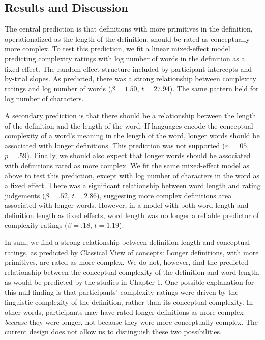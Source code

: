\subsection{Results and Discussion}
The central prediction is that definitions with more primitives in the definition, operationalized as the length of the definition, should be rated as conceptually more complex. To test this prediction, we fit a linear mixed-effect model predicting complexity ratings with log number of words in the definition as a fixed effect. The random effect structure included by-participant intercepts and by-trial slopes. As predicted, there was a strong relationship between complexity ratings and log number of words ($\beta=1.50$, $t =27.94$). The same pattern held for log number of characters.

A secondary prediction is that there should be a relationship between the length of the definition and the length of the word: If languages encode the conceptual complexity of a word's meaning in the length of the word, longer words should be associated with longer definitions. This prediction was not supported ($r=.05$, $p =.59$). Finally, we should also expect that  longer words should be associated with definitions rated as more complex. We fit the same mixed-effect model as above to test this prediction, except with log number of characters in the word as a fixed effect. There was a significant relationship between word length and rating judgements ($\beta=.52$, $t =2.86$), suggesting more complex definitions area associated with longer words. However, in a model with both word length and definition length as fixed effects, word length was no longer a reliable predictor of complexity ratings ($\beta=.18$, $t =1.19$).

In sum, we find a strong relationship between definition length and conceptual ratings, as predicted by Classical View of concepts: Longer definitions, with more primitives, are rated as more complex. We do not, however, find the predicted relationship between the conceptual complexity of the definition and word length, as would be predicted by the studies in Chapter 1.  One possible explanation for this null finding is that participants' complexity ratings were driven by the linguistic complexity of the definition, rather than its conceptual complexity. In other words, participants may have  rated longer definitions as more complex {\it because} they were longer, not because they were more conceptually complex. The current design does not allow us to distinguish these two possibilities.

